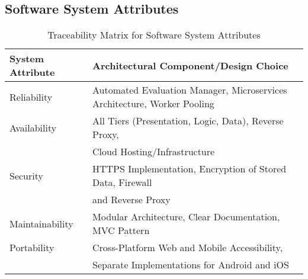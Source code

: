 \subsection{Software System Attributes}
\label{subsec:software_system_attributes}%
\begin{table}[h]
    \centering
    \begin{tabular}{|l|l|}
    \hline
    \textbf{System Attribute} & \textbf{Architectural Component/Design Choice} \\
    \hline
    Reliability & Automated Evaluation Manager, Microservices Architecture, Worker Pooling \\
    \hline
    Availability & All Tiers (Presentation, Logic, Data), Reverse Proxy, \\ &Cloud Hosting/Infrastructure \\
    \hline
    Security & HTTPS Implementation, Encryption of Stored Data, Firewall \\ &and Reverse Proxy \\
    \hline
    Maintainability & Modular Architecture, Clear Documentation, MVC Pattern \\
    \hline
    Portability & Cross-Platform Web and Mobile Accessibility, \\ &Separate Implementations for Android and iOS \\
    \hline
    \end{tabular}
    \caption{Traceability Matrix for Software System Attributes}
    \label{table:software-system-attributes-traceability}
    \end{table}
    